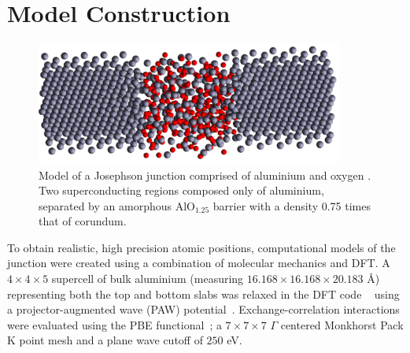 \section{Model Construction}\label{sec:jjmodel}
\begin{figure}[htp]
\includegraphics[width=0.9\textwidth]{figures/AlO125_075}
\caption[Atomistic Josephson Junction Model]{\label{fig:povray}Model of a Josephson junction comprised of aluminium  and oxygen . Two superconducting regions composed only of aluminium, separated by an amorphous AlO$_{1.25}$ barrier with a density 0.75 times that of corundum.}%
\end{figure}

To obtain realistic, high precision atomic positions, computational models of the junction were created using a combination of molecular mechanics and DFT.
A $4\!\times\!4\!\times\!5$ supercell of bulk aluminium (measuring $16.168\times16.168\times20.183$ \AA) representing both the top and bottom slabs was relaxed in the DFT code ~\cite{Kresse1994, Kresse1996, Kresse1996a} using a projector-augmented wave (PAW) potential~\cite{Kresse1999, Blochl1994}.
Exchange-correlation interactions were evaluated using the PBE functional~\cite{Perdew1996}; a $7\!\times\!7\!\times\!7$ $\Gamma$ centered Monkhorst Pack K point mesh and a plane wave cutoff of $250$ eV.

